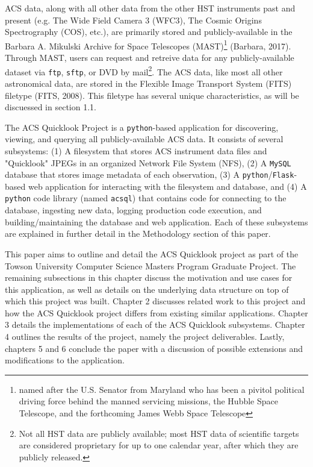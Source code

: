 \documentclass[10pt,journal,compsoc]{IEEEtran}
\begin{document}
ACS data, along with all other data from the other HST instruments past and present
(e.g. The Wide Field Camera 3 (WFC3), The Cosmic Origins Spectrography (COS), etc.),
are primarily stored and publicly-available in the Barbara A. Mikulski Archive for
Space Telescopes (MAST)\footnote{named after the U.S. Senator from Maryland who has
been a pivitol political driving force behind the manned servicing missions, the
Hubble Space Telescope, and the forthcoming James Webb Space Telescope} (Barbara, 2017).
Through MAST, users can request and retreive data for any publicly-available dataset
via \texttt{ftp}, \texttt{sftp}, or DVD by mail\footnote{Not all HST data are publicly
available; most HST data of scientific targets are considered proprietary for up to
one calendar year, after which they are publicly released.}.  The ACS data, like most all other
astronomical data, are stored in the Flexible Image Transport System (FITS) filetype
(FITS, 2008).  This filetype has several unique characteristics, as will be
discuessed in section 1.1.

The ACS Quicklook Project is a \texttt{python}-based application for discovering,
viewing, and querying all publicly-available ACS data.  It consists of several subsystems:
(1) A filesystem that stores ACS instrument data files and "Quicklook" JPEGs in an
organized Network File System (NFS), (2) A \texttt{MySQL} database that stores image
metadata of each observation, (3) A \texttt{python}/\texttt{Flask}-based web application
for interacting with the filesystem and database, and (4) A \texttt{python} code library
(named \texttt{acsql}) that contains code for connecting to the database, ingesting new
data, logging production code execution, and building/maintaining the database and web
application.  Each of these subsystems are explained in further detail in the Methodology
section of this paper.

This paper aims to outline and detail the ACS Quicklook project as part of the Towson
University Computer Science Masters Program Graduate Project.  The remaining subsections
in this chapter discuss the motivation and use cases for this application, as well as
details on the underlying data structure on top of which this project was built.  Chapter
2 discusses related work to this project and how the ACS Quicklook project differs from
existing similar applications.  Chapter 3 details the implementations of each of the
ACS Quicklook subsystems.  Chapter 4 outlines the results of the project, namely the
project deliverables.  Lastly, chapters 5 and 6 conclude the paper with a discussion
of possible extensions and modifications to the application.
\end{document}
